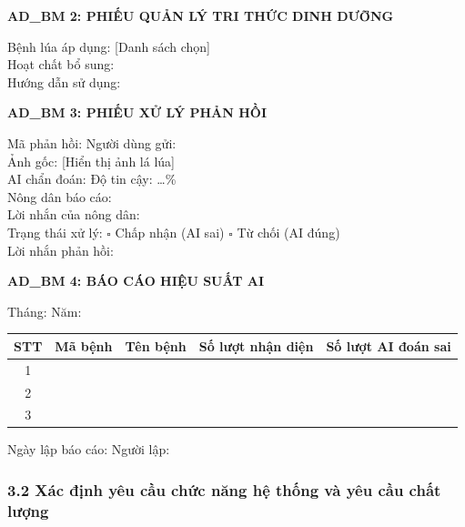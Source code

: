 \documentclass[12pt,a4paper]{article}
\begin{document}
\vspace{0.3cm}
\noindent\textbf{AD\_BM 2: PHIẾU QUẢN LÝ TRI THỨC DINH DƯỠNG}

\noindent Bệnh lúa áp dụng: [Danh sách chọn] \dotfill \\
Hoạt chất bổ sung: \dotfill \\
Hướng dẫn sử dụng: \dotfill \\
\dotfill

\vspace{0.3cm}
\noindent\textbf{AD\_BM 3: PHIẾU XỬ LÝ PHẢN HỒI}

\noindent Mã phản hồi: \dotfill \quad Người dùng gửi: \dotfill \\
Ảnh gốc: [Hiển thị ảnh lá lúa] \\
AI chẩn đoán: \dotfill \quad Độ tin cậy: \dots\% \\
Nông dân báo cáo: \dotfill \\
Lời nhắn của nông dân: \dotfill \\
Trạng thái xử lý: $\square$ Chấp nhận (AI sai) \quad $\square$ Từ chối (AI đúng) \\
Lời nhắn phản hồi: \dotfill \\
\dotfill

\vspace{0.3cm}
\noindent\textbf{AD\_BM 4: BÁO CÁO HIỆU SUẤT AI}

\noindent Tháng: \dotfill \quad Năm: \dotfill

\begin{longtable}{|c|p{2cm}|p{4cm}|p{3cm}|p{3cm}|}
\hline
\rowcolor{headerblue}
\textbf{STT} & \textbf{Mã bệnh} & \textbf{Tên bệnh} & \textbf{Số lượt nhận diện} & \textbf{Số lượt AI đoán sai} \\
\hline
1 & & & & \\
\hline
2 & & & & \\
\hline
3 & & & & \\
\hline
\end{longtable}
\noindent Ngày lập báo cáo: \dotfill \quad Người lập: \dotfill

\hrulefill

\subsubsection*{3.2 Xác định yêu cầu chức năng hệ thống và yêu cầu chất lượng}
\end{document}
